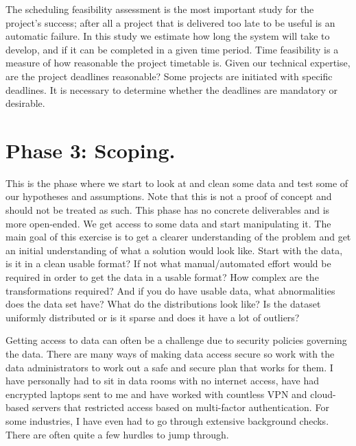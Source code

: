 \documentclass[
]{book}
\begin{document}
The scheduling feasibility assessment is the most important study for the project's success; after all a project that is delivered too late to be useful is an automatic failure. In this study we estimate how long the system will take to develop, and if it can be completed in a given time period. Time feasibility is a measure of how reasonable the project timetable is. Given our technical expertise, are the project deadlines reasonable? Some projects are initiated with specific deadlines. It is necessary to determine whether the deadlines are mandatory or desirable.

\hypertarget{phase-3-scoping.}{%
\section{Phase 3: Scoping.}\label{phase-3-scoping.}}

This is the phase where we start to look at and clean some data and test some of our hypotheses and assumptions. Note that this is not a proof of concept and should not be treated as such. This phase has no concrete deliverables and is more open-ended. We get access to some data and start manipulating it. The main goal of this exercise is to get a clearer understanding of the problem and get an initial understanding of what a solution would look like. Start with the data, is it in a clean usable format? If not what manual/automated effort would be required in order to get the data in a usable format? How complex are the transformations required? And if you do have usable data, what abnormalities does the data set have? What do the distributions look like? Is the dataset uniformly distributed or is it sparse and does it have a lot of outliers?

\begin{infobox}

Getting access to data can often be a challenge due to security policies governing the data. There are many ways of making data access secure so work with the data administrators to work out a safe and secure plan that works for them. I have personally had to sit in data rooms with no internet access, have had encrypted laptops sent to me and have worked with countless VPN and cloud-based servers that restricted access based on multi-factor authentication. For some industries, I have even had to go through extensive background checks. There are often quite a few hurdles to jump through.

\end{infobox}
\end{document}
